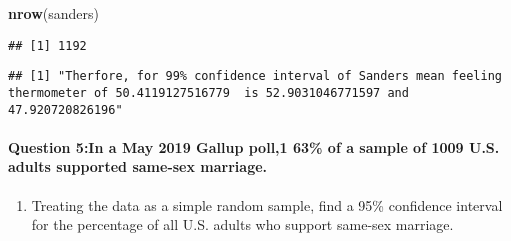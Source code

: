 \documentclass[
]{article}
\newenvironment{Shaded}{\begin{snugshade}}{\end{snugshade}}
\newcommand{\CommentTok}[1]{\textcolor[rgb]{0.56,0.35,0.01}{\textit{#1}}}
\newcommand{\DecValTok}[1]{\textcolor[rgb]{0.00,0.00,0.81}{#1}}
\newcommand{\FloatTok}[1]{\textcolor[rgb]{0.00,0.00,0.81}{#1}}
\newcommand{\FunctionTok}[1]{\textcolor[rgb]{0.13,0.29,0.53}{\textbf{#1}}}
\newcommand{\NormalTok}[1]{#1}
\newcommand{\OtherTok}[1]{\textcolor[rgb]{0.56,0.35,0.01}{#1}}
\newcommand{\SpecialCharTok}[1]{\textcolor[rgb]{0.81,0.36,0.00}{\textbf{#1}}}
\newcommand{\StringTok}[1]{\textcolor[rgb]{0.31,0.60,0.02}{#1}}
\providecommand{\tightlist}{%
  \setlength{\itemsep}{0pt}\setlength{\parskip}{0pt}}
\begin{document}
\begin{Shaded}
\begin{Highlighting}[]
\FunctionTok{nrow}\NormalTok{(sanders)}
\end{Highlighting}
\end{Shaded}

\begin{verbatim}
## [1] 1192
\end{verbatim}

\begin{Shaded}
\end{Shaded}

\begin{verbatim}
## [1] "Therfore, for 99% confidence interval of Sanders mean feeling thermometer of 50.4119127516779  is 52.9031046771597 and 47.920720826196"
\end{verbatim}

\hypertarget{question-5in-a-may-2019-gallup-poll1-63-of-a-sample-of-1009-u.s.-adults-supported-same-sex-marriage.}{%
\paragraph{Question 5:In a May 2019 Gallup poll,1 63\% of a sample of
1009 U.S. adults supported same-sex
marriage.}\label{question-5in-a-may-2019-gallup-poll1-63-of-a-sample-of-1009-u.s.-adults-supported-same-sex-marriage.}}

\begin{enumerate}
\def\labelenumi{(\alph{enumi})}
\tightlist
\item
  Treating the data as a simple random sample, find a 95\% confidence
  interval for the percentage of all U.S. adults who support same-sex
  marriage.
\end{enumerate}
\end{document}
